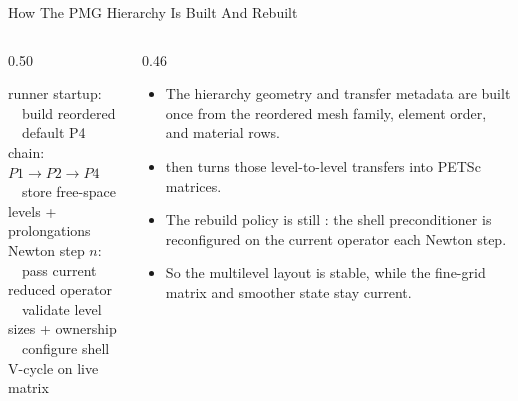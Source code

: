 \documentclass[aspectratio=169,10pt]{beamer}
\begin{document}
\begin{frame}{How The PMG Hierarchy Is Built And Rebuilt}
\small
\begin{columns}[T,totalwidth=\textwidth]
\begin{column}{0.50\textwidth}
\begin{pseudobox}
runner startup:\\
\ \ build reordered \\
\ \ default P4 chain: \(P1 \rightarrow P2 \rightarrow P4\)\\
\ \ store free-space levels + prolongations\\[0.08cm]
Newton step \(n\):\\
\ \ pass current reduced operator\\
\ \ validate level sizes + ownership\\
\ \ configure shell V-cycle on live matrix
\end{pseudobox}
\end{column}
\begin{column}{0.46\textwidth}
\begin{softbox}
\begin{itemize}
  \item The hierarchy geometry and transfer metadata are built once from the reordered mesh family, element order, and material rows.
  \item {} then turns those level-to-level transfers into PETSc matrices.
  \item The rebuild policy is still : the shell preconditioner is reconfigured on the current operator each Newton step.
  \item So the multilevel layout is stable, while the fine-grid matrix and smoother state stay current.
\end{itemize}
\end{softbox}
\end{column}
\end{columns}
\end{frame}
\end{document}
